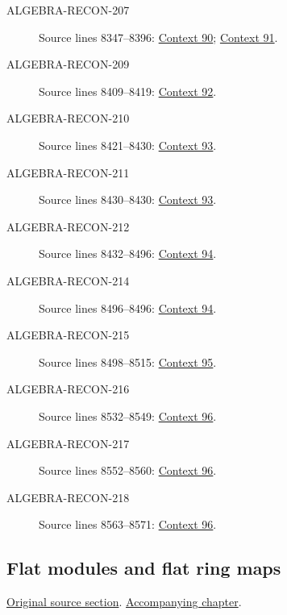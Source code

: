 \begin{description}
\item[ALGEBRA-RECON-207] Source lines 8347--8396: \hyperlink{algebra-context-090}{Context 90}; \hyperlink{algebra-context-091}{Context 91}.
\item[ALGEBRA-RECON-209] Source lines 8409--8419: \hyperlink{algebra-context-092}{Context 92}.
\item[ALGEBRA-RECON-210] Source lines 8421--8430: \hyperlink{algebra-context-093}{Context 93}.
\item[ALGEBRA-RECON-211] Source lines 8430--8430: \hyperlink{algebra-context-093}{Context 93}.
\item[ALGEBRA-RECON-212] Source lines 8432--8496: \hyperlink{algebra-context-094}{Context 94}.
\item[ALGEBRA-RECON-214] Source lines 8496--8496: \hyperlink{algebra-context-094}{Context 94}.
\item[ALGEBRA-RECON-215] Source lines 8498--8515: \hyperlink{algebra-context-095}{Context 95}.
\item[ALGEBRA-RECON-216] Source lines 8532--8549: \hyperlink{algebra-context-096}{Context 96}.
\item[ALGEBRA-RECON-217] Source lines 8552--8560: \hyperlink{algebra-context-096}{Context 96}.
\item[ALGEBRA-RECON-218] Source lines 8563--8571: \hyperlink{algebra-context-096}{Context 96}.
\end{description}

\subsection{Flat modules and flat ring maps}
\hypertarget{algebra-source-section-flat}{}
\noindent\href{https://github.com/stacks/stacks-project/blob/a04446e57ec1fbc252a871afcec7752fb2807b14/algebra.tex\#L8587}{Original source section}. \href{algebra.pdf\#nameddest=section-flat}{Accompanying chapter}.

